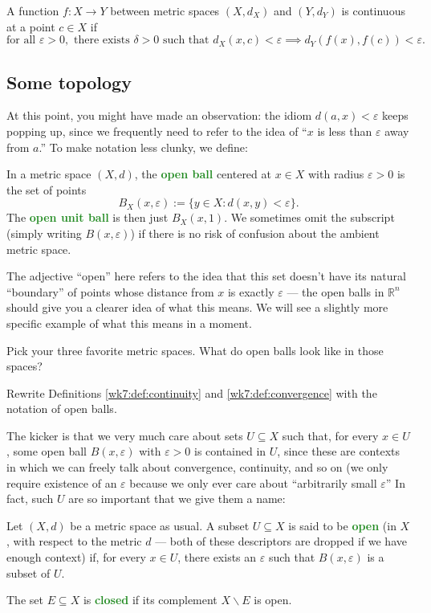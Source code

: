 \documentclass[10pt]{scrartcl}
\providecommand{\eps}{\varepsilon}
\providecommand{\RR}{\mathbb R}
\providecommand{\setdiff}{\smallsetminus}
\providecommand{\vocab}[1]{{\textbf{\textcolor{ForestGreen}{#1}}}}
\begin{document}
\begin{definition}[Continuity]\label{wk7:def:continuity}
	A function $f\colon X\to Y$ between metric spaces $(X, d_X)$ and $(Y, d_Y)$
	is continuous at a point $c\in X$ if
	\[\text{for all }\eps > 0,\text{ there exists }\delta > 0
	\text{ such that }d_X(x, c) < \eps \implies d_Y(f(x), f(c)) < \eps.\]
\end{definition}

\subsection{Some topology}

At this point, you might have made an observation:
the idiom $d(a, x) < \eps$ keeps popping up,
since we frequently need to refer to the idea of
``$x$ is less than $\eps$ away from $a$.''
To make notation less clunky, we define:
\begin{definition}\label{wk7:def:openball}
	In a metric space $(X, d)$, the \vocab{open ball}
	centered at $x\in X$ with radius $\eps > 0$ is the set of points
	\[B_X(x, \eps) := \{y\in X : d(x, y) < \eps\}.\]
	The \vocab{open unit ball} is then just $B_X(x, 1)$.
	We sometimes omit the subscript (simply writing $B(x,\eps)$)
	if there is no risk of confusion about the ambient metric space.
\end{definition}

The adjective ``open'' here refers to the idea that this set
doesn't have its natural ``boundary'' of points
whose distance from $x$ is exactly $\eps$ ---
the open balls in $\RR^n$ should give you a clearer idea of what this means.
We will see a slightly more specific example of what this means
in a moment.

\begin{exercise}
	Pick your three favorite metric spaces.
	What do open balls look like in those spaces?
\end{exercise}

\begin{exercise}
	Rewrite Definitions \ref{wk7:def:continuity} and \ref{wk7:def:convergence}
	with the notation of open balls.
\end{exercise}

The kicker is that we very much care about sets $U\subseteq X$
such that, for every $x\in U$, some open ball $B(x,\eps)$ with $\eps > 0$
is contained in $U$, since these are contexts in which
we can freely talk about convergence, continuity, and so on
(we only require existence of an $\eps$
because we only ever care about ``arbitrarily small $\eps$''
In fact, such $U$ are so important that we give them a name:
\begin{definition}\label{wk7:def:openclosed}
	Let $(X, d)$ be a metric space as usual.
	A subset $U\subseteq X$ is said to be \vocab{open}
	(in $X$, with respect to the metric $d$ ---
	both of these descriptors are dropped if we have enough context)
	if, for every $x\in U$, there exists an $\eps$ such that $B(x,\eps)$
	is a subset of $U$.
	
	The set $E\subseteq X$ is \vocab{closed} if its complement
	$X\setdiff E$ is open.
\end{definition}
\end{document}
